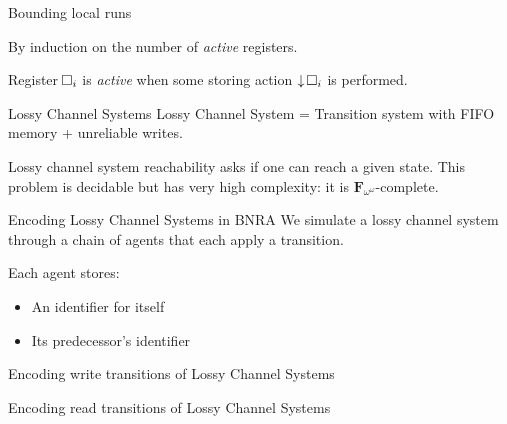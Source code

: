 \documentclass{beamer}
\newcommand{\reg}{\hspace{-0.5mm}\square}
\begin{document}
\begin{frame}{Bounding local runs}
	
	
	By induction on the number of \color{blue}\emph{active }\color{black} registers.
	
	Register $\reg_i$ is \emph{active} when some storing action $\downarrow \reg_i$ is performed. 
	\vspace{0.5cm}
	
	
	
\end{frame}

\begin{frame}{Lossy Channel Systems}
	Lossy Channel System = Transition system with FIFO memory + unreliable writes.
	
	\begin{center}
	\resizebox{!}{4.5cm}{
	
	}
	\end{center}

	 Lossy channel system reachability asks if one can reach a given state. This problem is decidable but has very high complexity: it is $\mathbf{F}_{\omega^\omega}$-complete. 
\end{frame}


\begin{frame}{Encoding Lossy Channel Systems in BNRA}
	We simulate a lossy channel system through a chain of agents that each apply a transition.
	
	Each agent stores:
	\begin{itemize}
		\item An identifier for itself
		
		\item Its predecessor's identifier
	\end{itemize} 
	
	\centering
	
	
\end{frame}


\begin{frame}{Encoding write transitions of Lossy Channel Systems}
	\centering
	

\end{frame}

\begin{frame}{Encoding read transitions of Lossy Channel Systems}
	\centering
	 
\end{frame}
\end{document}
